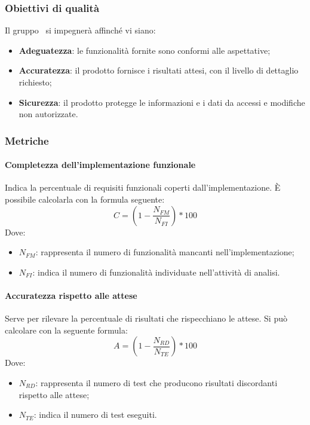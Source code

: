 \documentclass[../PianoDiQualifica.tex]{subfiles}
\begin{document}
				\subsubsection{Obiettivi di qualità}
				Il gruppo \kpanic\ si impegnerà affinché vi siano:
				\begin{itemize}
					\item \textbf{Adeguatezza}: le funzionalità fornite sono conformi alle aspettative;
					\item \textbf{Accuratezza}: il prodotto fornisce i risultati attesi, con il livello di dettaglio richiesto;
					\item \textbf{Sicurezza}: il prodotto protegge le informazioni e i dati da accessi e modifiche non autorizzate.
				\end{itemize}
			
			\subsubsection{Metriche}
				\paragraph{Completezza dell'implementazione funzionale}
				Indica la percentuale di requisiti funzionali coperti dall'implementazione.
				È possibile calcolarla con la formula seguente:
				\begin{equation*}
					C = (1 - \frac{N_{FM}}{N_{FI}}) * 100
				\end{equation*}
				Dove:
				\begin{itemize}
					\item \textbf{$N_{FM}$}: rappresenta il numero di funzionalità mancanti nell'implementazione;
					 \item \textbf{$N_{FI}$}: indica il numero di funzionalità individuate nell'attività di analisi.
				\end{itemize}

				\paragraph{Accuratezza rispetto alle attese}
				Serve per rilevare la percentuale di risultati che rispecchiano le attese.
				Si può calcolare con la seguente formula:
				\begin{equation*}
					A = (1 - \frac{N_{RD}}{N_{TE}})*100
				\end{equation*}
				Dove:
				\begin{itemize}
					\item \textbf{$N_{RD}$}: rappresenta il numero di test che producono risultati discordanti rispetto alle attese;
					\item \textbf{$N_{TE}$}: indica il numero di test eseguiti.
				\end{itemize}
				
\end{document}

